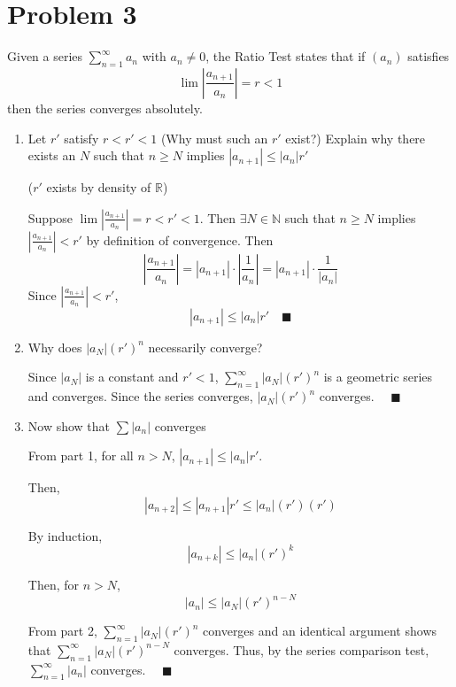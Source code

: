 \documentclass[12pt]{article}
\newcommand{\R}{\mathbb{R}}
\newcommand{\N}{\mathbb{N}}
\newcommand{\qed}{\quad \blacksquare}
\newcommand{\abs}[1]{\left\vert #1 \right\vert}
\begin{document}
\pagebreak

\section*{Problem 3}
Given a series $\sum_{n=1}^{\infty} a_n$ with $a_n \neq 0$, the Ratio Test states that if $(a_n)$ satisfies 
\[\lim \abs{\frac{a_{n+1}}{a_n}} = r < 1\]
then the series converges absolutely. 

\begin{enumerate}
    \item Let $r'$ satisfy $r < r' < 1$ (Why must such an $r'$ exist?) Explain why there exists an $N$ such that $n \geq N$ implies $\abs{a_{n+1}} \leq \abs{a_n}r'$
    
        \color{blue}
            ($r'$ exists by density of $\R$)

            Suppose $\lim \abs{\frac{a_{n+1}}{a_n}} = r < r' < 1$. Then $\exists N \in \N$ such that $n \geq N$ implies $\abs{\frac{a_{n+1}}{a_n}} < r'$ by definition of convergence. Then 
            \[\abs{\frac{a_{n+1}}{a_n}} = \abs{a_{n+1}} \cdot \abs{\frac{1}{a_n}} = \abs{a_{n+1}} \cdot \frac{1}{\abs{a_n}}\]
            Since $\abs{\frac{a_{n+1}}{a_n}} < r'$, 
            \[\abs{a_{n+1}} \leq \abs{a_n}r' \qed\]
        \color{black}

    \item Why does $\abs{a_N}(r')^n$ necessarily converge?
     
        \color{blue}
            Since $\abs{a_N}$ is a constant and $r' < 1$, $\sum_{n=1}^{\infty} \abs{a_N}(r')^n$ is a geometric series and converges. Since the series converges, $\abs{a_N}(r')^n$ converges. $\qed$
        \color{black}

    \item Now show that $\sum \abs{a_n}$ converges
    
        \color{blue}
            From part 1, for all $n > N$, $\abs{a_{n+1}} \leq \abs{a_n}r'$. 
           
            Then, 
            \[\abs{a_{n+2}} \leq \abs{a_{n+1}}r' \leq \abs{a_n}(r')(r')\]

            By induction, 
            \[\abs{a_{n+k}} \leq \abs{a_{n}}(r')^k\]
            
            Then, for $n > N$, 
            \[\abs{a_n} \leq \abs{a_N}(r')^{n-N}\]
        
            
            From part 2, $\sum_{n=1}^{\infty} \abs{a_N}(r')^n$ converges and an identical argument shows that $\sum_{n=1}^{\infty} \abs{a_N}(r')^{n-N}$ converges. Thus, by the series comparison test, $\sum_{n=1}^{\infty} \abs{a_n}$ converges. $\qed$                
        \color{black}

\end{enumerate}
\end{document}
